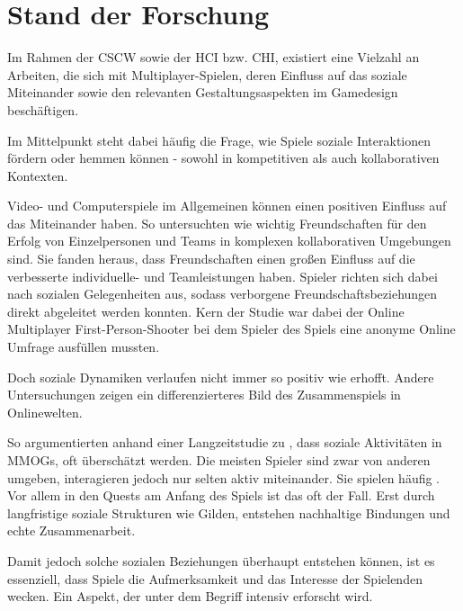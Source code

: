 \chapter{Stand der Forschung}\label{sec:related-works}

Im Rahmen der \ac{CSCW} sowie der \ac{HCI} bzw. \ac{CHI}, existiert eine Vielzahl an Arbeiten, die sich mit Multiplayer-Spielen, deren Einfluss auf das soziale Miteinander sowie den relevanten Gestaltungsaspekten im Gamedesign beschäftigen.

Im Mittelpunkt steht dabei häufig die Frage, wie Spiele soziale Interaktionen fördern oder hemmen können - sowohl in kompetitiven als auch kollaborativen Kontexten.

Video- und Computerspiele im Allgemeinen können einen positiven Einfluss auf das Miteinander haben. So untersuchten \cite{mason_friends_2013} wie wichtig Freundschaften für den Erfolg von Einzelpersonen und Teams in komplexen kollaborativen Umgebungen sind. Sie fanden heraus, dass Freundschaften einen großen Einfluss auf die verbesserte individuelle- und Teamleistungen haben. Spieler richten sich dabei nach sozialen Gelegenheiten aus, sodass verborgene Freundschaftsbeziehungen direkt abgeleitet werden konnten. Kern der Studie war dabei der Online Multiplayer First-Person-Shooter  bei dem Spieler des Spiels eine anonyme Online Umfrage ausfüllen mussten. 

Doch soziale Dynamiken verlaufen nicht immer so positiv wie erhofft. Andere Untersuchungen zeigen ein differenzierteres Bild des Zusammenspiels in Onlinewelten.

So argumentierten \cite{ducheneaut_alone_2006} anhand einer Langzeitstudie zu , dass soziale Aktivitäten in \ac{MMOG}s, oft überschätzt werden. Die meisten Spieler sind zwar von anderen umgeben, interagieren jedoch nur selten aktiv miteinander. Sie spielen häufig . Vor allem in den Quests am Anfang des Spiels ist das oft der Fall. Erst durch langfristige soziale Strukturen wie Gilden, entstehen nachhaltige Bindungen und echte Zusammenarbeit.

Damit jedoch solche sozialen Beziehungen überhaupt entstehen können, ist es essenziell, dass Spiele die Aufmerksamkeit und das Interesse der Spielenden wecken. Ein Aspekt, der unter dem Begriff  intensiv erforscht wird.

